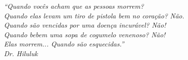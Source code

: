 \begin{epigrafe}
  \vspace*{\fill}
  \begin{flushright}
    \textit{``Quando vocês acham que as pessoas morrem? \\
            Quando elas levam um tiro de pistola bem no coração? Não. \\
            Quando são vencidas por uma doença incurável? Não! \\
            Quando bebem uma sopa de cogumelo venenoso? Não! \\
            Elas morrem... Quando são esquecidas.''\\
      Dr. Hiluluk}
  \end{flushright}
\end{epigrafe}
